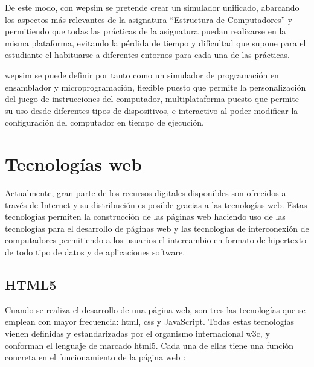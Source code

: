 De este modo, con \acrshort{wepsim} se pretende crear un simulador unificado, abarcando los aspectos más relevantes de la asignatura ``Estructura de Computadores'' y permitiendo que todas las prácticas de la asignatura puedan realizarse en la misma plataforma, evitando la pérdida de tiempo y dificultad que supone para el estudiante el habituarse a diferentes entornos para cada una de las prácticas.

\acrshort{wepsim} se puede definir por tanto como un simulador de programación en \gls{ensamblador} y microprogramación, flexible puesto que permite la personalización del juego de instrucciones del computador, multiplataforma puesto que permite su uso desde diferentes tipos de dispositivos, e interactivo al poder modificar la configuración del computador en tiempo de ejecución.


\section{Tecnologías web}
\label{sec:tecnologias_web}

Actualmente, gran parte de los recursos digitales disponibles son ofrecidos a través de Internet y su distribución es posible gracias a las tecnologías web. Estas tecnologías permiten la construcción de las páginas web haciendo uso de las tecnologías para el desarrollo de páginas web y las tecnologías de interconexión de computadores permitiendo a los usuarios el intercambio en formato de hipertexto de todo tipo de datos y de aplicaciones \gls{software}.

\subsection{HTML5}
\label{sec:html5}

Cuando se realiza el desarrollo de una página web, son tres las tecnologías que se emplean con mayor frecuencia: \acrfull{html}, \acrfull{css} y JavaScript. Todas estas tecnologías vienen definidas y estandarizadas por el organismo internacional \acrfull{w3c}, y conforman el lenguaje de marcado \acrshort{html}5. Cada una de ellas tiene una función concreta en el funcionamiento de la página web \cite{duckett2014web}:

